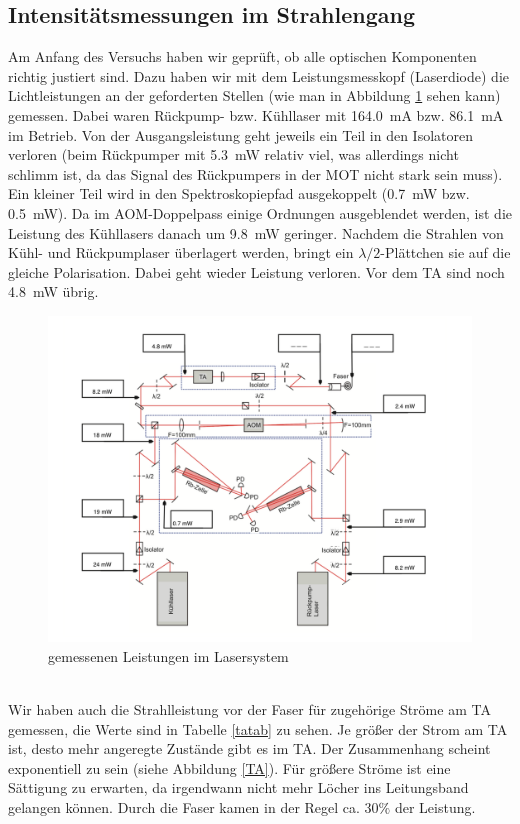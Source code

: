 \documentclass[12pt, a4paper]{article}
\begin{document}
  \subsection{Intensitätsmessungen im Strahlengang}
    \label{intensities}
  Am Anfang des Versuchs haben wir geprüft, ob alle optischen Komponenten richtig justiert sind. Dazu haben wir mit dem Leistungsmesskopf (Laserdiode) die Lichtleistungen an der geforderten Stellen (wie man in Abbildung \ref{leistung} sehen kann) gemessen. Dabei waren  Rückpump- bzw. Kühllaser mit \SI{164,0}{\mA} bzw. \SI{86,1}{\mA} im Betrieb. Von der Ausgangsleistung geht jeweils ein Teil in den Isolatoren verloren (beim Rückpumper mit \SI{5,3}{\mW} relativ viel, was allerdings nicht schlimm ist, da das Signal des Rückpumpers in der MOT nicht stark sein muss). Ein kleiner Teil wird in den Spektroskopiepfad ausgekoppelt (\SI{0,7}{\mW} bzw. \SI{0,5}{\mW}). Da im AOM-Doppelpass einige Ordnungen ausgeblendet werden, ist die Leistung des Kühllasers danach um \SI{9,8}{\mW} geringer. Nachdem die Strahlen von Kühl- und Rückpumplaser überlagert werden, bringt ein $\lambda /2$-Plättchen sie auf die gleiche Polarisation. Dabei geht wieder Leistung verloren. Vor dem TA sind noch \SI{4,8}{\mW} übrig.
    \begin{figure}[h!]
  \centering
  \includegraphics[width=\textwidth]{Strahlenleistungen.png}
  \caption{gemessenen Leistungen im Lasersystem}
  \label{leistung}
  \end{figure}
\\Wir haben auch die Strahlleistung vor der Faser für zugehörige Ströme am TA gemessen, die Werte sind in Tabelle \ref{tatab} zu sehen. Je größer der Strom am TA ist, desto mehr angeregte Zustände gibt es im TA. Der Zusammenhang scheint exponentiell zu sein (siehe Abbildung \ref{TA}). Für größere Ströme ist eine Sättigung zu erwarten, da irgendwann nicht mehr Löcher ins Leitungsband gelangen können. Durch die Faser kamen in der Regel ca. $30\%$ der Leistung.
\end{document}
